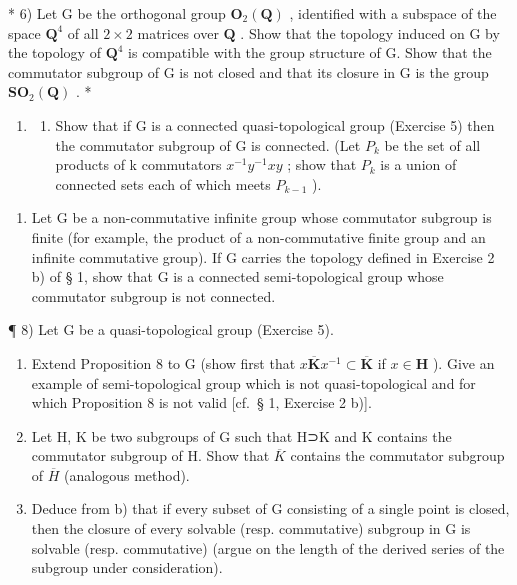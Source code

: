 * 6) Let G be the orthogonal group \(\mathbf{O}_{2}(\mathbf{Q})\) , identified with a subspace of the space \(\mathbf{Q}^{4}\) of all \(2 \times 2\) matrices over \(\mathbf{Q}\) . Show that the topology induced on G by the topology of \(\mathbf{Q}^{4}\) is compatible with the group structure of G. Show that the commutator subgroup of G is not closed and that its closure in G is the group \(\mathbf{SO}_{2}(\mathbf{Q})\) . *

\begin{enumerate}
\def\labelenumi{\arabic{enumi})}
\setcounter{enumi}{6}
\tightlist
\item
  \begin{enumerate}
  \def\labelenumii{\alph{enumii})}
  \tightlist
  \item
    Show that if G is a connected quasi-topological group (Exercise 5) then the commutator subgroup of G is connected. (Let \(P_k\) be the set of all products of k commutators \(x^{-1}y^{-1}xy\) ; show that \(P_k\) is a union of connected sets each of which meets \(P_{k-1}\) ).
  \end{enumerate}
\end{enumerate}

\begin{enumerate}
\def\labelenumi{\alph{enumi})}
\setcounter{enumi}{1}
\tightlist
\item
  Let G be a non-commutative infinite group whose commutator subgroup is finite (for example, the product of a non-commutative finite group and an infinite commutative group). If G carries the topology defined in Exercise 2 b) of § 1, show that G is a connected semi-topological group whose commutator subgroup is not connected.
\end{enumerate}

¶ 8) Let G be a quasi-topological group (Exercise 5).

\begin{enumerate}
\def\labelenumi{\alph{enumi})}
\item
  Extend Proposition 8 to G (show first that \(x\overline{\mathbf{K}}x^{-1} \subset \overline{\mathbf{K}}\) if \(x \in \mathbf{H}\) ). Give an example of semi-topological group which is not quasi-topological and for which Proposition 8 is not valid {[}cf.~§ 1, Exercise 2 b){]}.
\item
  Let H, K be two subgroups of G such that H⊃K and K contains the commutator subgroup of H. Show that \(\overline{K}\) contains the commutator subgroup of \(\overline{H}\) (analogous method).
\item
  Deduce from b) that if every subset of G consisting of a single point is closed, then the closure of every solvable (resp. commutative) subgroup in G is solvable (resp. commutative) (argue on the length of the derived series of the subgroup under consideration).
\end{enumerate}

